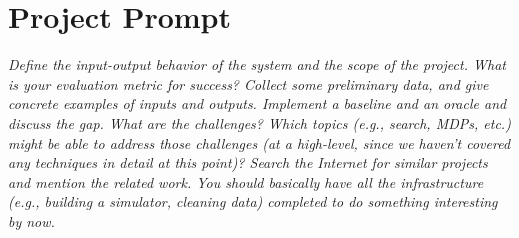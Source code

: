\documentclass{article}
\begin{document}
\section*{Project Prompt}

\textit{Define the input-output behavior of the system and the scope of the project. What is your evaluation metric for success? Collect some preliminary data, and give concrete examples of inputs and outputs. Implement a baseline and an oracle and discuss the gap. What are the challenges? Which topics (e.g., search, MDPs, etc.) might be able to address those challenges (at a high-level, since we haven't covered any techniques in detail at this point)? Search the Internet for similar projects and mention the related work. You should basically have all the infrastructure (e.g., building a simulator, cleaning data) completed to do something interesting by now.}
\end{document}
